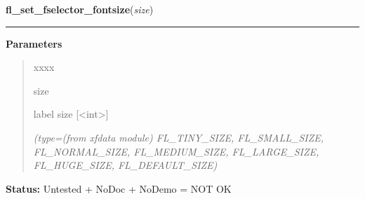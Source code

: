 \hspace{.8\funcindent}\begin{boxedminipage}{\funcwidth}

    \raggedright \textbf{fl\_set\_fselector\_fontsize}(\textit{size})

    \vspace{-1.5ex}

    \rule{\textwidth}{0.5\fboxrule}
\setlength{\parskip}{2ex}
\setlength{\parskip}{1ex}
      \textbf{Parameters}
      \vspace{-1ex}

      \begin{quote}
        \begin{Ventry}{xxxx}

          \item[size]

          label size [{\textless}int{\textgreater}]

            {\it (type=(from xfdata module) FL\_TINY\_SIZE, FL\_SMALL\_SIZE, FL\_NORMAL\_SIZE, 
FL\_MEDIUM\_SIZE, FL\_LARGE\_SIZE, FL\_HUGE\_SIZE, FL\_DEFAULT\_SIZE)}

        \end{Ventry}

      \end{quote}

\textbf{Status:} Untested + NoDoc + NoDemo = NOT OK



    \end{boxedminipage}

    \label{xformslib:library:fl_set_fselector_fontstyle}

    \vspace{0.5ex}

